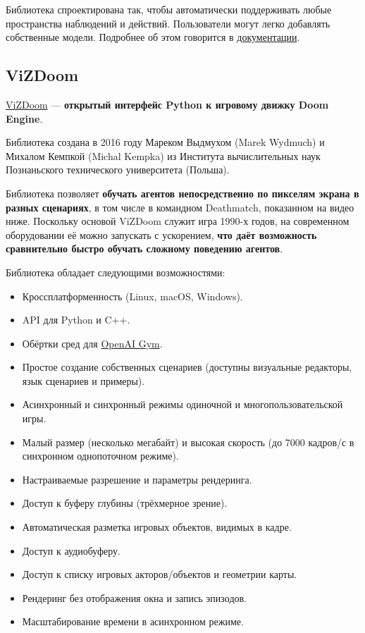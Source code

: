 \documentclass[11pt,a4paper]{article}
\begin{document}
Библиотека спроектирована так, чтобы автоматически поддерживать любые пространства наблюдений и действий. Пользователи могут легко добавлять собственные модели. Подробнее об этом говорится в \href{https://www.samplefactory.dev/03-customization/custom-models/\#actor-critic-models-in-sample-factory}{документации}.

\subsection{ViZDoom}\label{vizdoom}

\href{https://vizdoom.cs.put.edu.pl/}{ViZDoom} --- \textbf{открытый интерфейс Python к игровому движку Doom Engine}.

Библиотека создана в 2016 году Мареком Выдмухом (Marek Wydmuch) и Михалом Кемпкой (Michal Kempka) из Института вычислительных наук Познаньского технического университета (Польша).

Библиотека позволяет \textbf{обучать агентов непосредственно по пикселям экрана в разных сценариях}, в том числе в командном Deathmatch, показанном на видео ниже. Поскольку основой ViZDoom служит игра 1990-х годов, на современном оборудовании её можно запускать с ускорением, \textbf{что даёт возможность сравнительно быстро обучать сложному поведению агентов}.

Библиотека обладает следующими возможностями:

\begin{itemize}
\tightlist
\item
  Кроссплатформенность (Linux, macOS, Windows).
\item
  API для Python и C++.
\item
  Обёртки сред для \href{https://www.gymlibrary.dev/}{OpenAI Gym}.
\item
  Простое создание собственных сценариев (доступны визуальные редакторы, язык сценариев и примеры).
\item
  Асинхронный и синхронный режимы одиночной и многопользовательской игры.
\item
  Малый размер (несколько мегабайт) и высокая скорость (до 7000 кадров/с в синхронном однопоточном режиме).
\item
  Настраиваемые разрешение и параметры рендеринга.
\item
  Доступ к буферу глубины (трёхмерное зрение).
\item
  Автоматическая разметка игровых объектов, видимых в кадре.
\item
  Доступ к аудиобуферу.
\item
  Доступ к списку игровых акторов/объектов и геометрии карты.
\item
  Рендеринг без отображения окна и запись эпизодов.
\item
  Масштабирование времени в асинхронном режиме.
\end{itemize}
\end{document}
